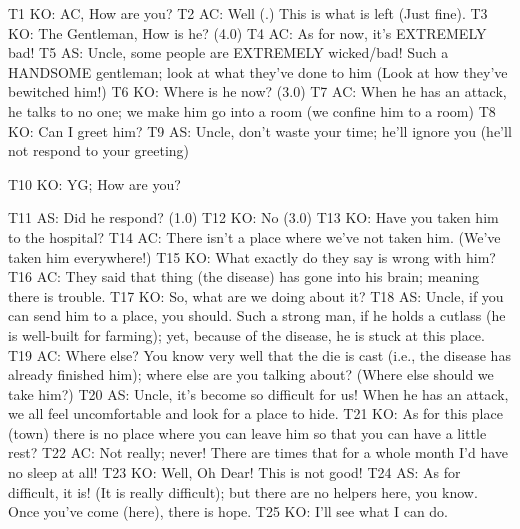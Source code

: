 \documentclass[output=paper,colorlinks,citecolor=brown]{langscibook}
\begin{document}
\begin{exe}
     T1 KO: AC, How are you?
     T2 AC: Well (.) This is what is left (Just fine).
     T3 KO: The Gentleman, How is he? (4.0)
     T4 AC: As for now, it’s EXTREMELY bad!
     T5 AS: Uncle, some people are EXTREMELY wicked/bad! Such a HANDSOME gentleman; look at what they’ve done to him (Look at how they’ve bewitched him!)
     T6 KO: Where is he now? (3.0)
     T7 AC: When he has an attack, he talks to no one; we make him go into a room (we confine him to a room)
     T8 KO: Can I greet him?
     T9 AS: Uncle, don’t waste your time; he’ll ignore you (he’ll not respond to your greeting)
\end{exe}
\begin{exe}
     T10 KO: YG; How are you?
\end{exe}
\begin{exe}
     T11 AS: Did he respond? (1.0)
     T12 KO: No (3.0) 
     T13 KO: Have you taken him to the hospital?
     T14 AC: There isn’t a place where we’ve not taken him. (We’ve taken him everywhere!)
     T15 KO: What exactly do they say is wrong with him?
     T16 AC: They said that thing (the disease) has gone into his brain; meaning there is trouble.
     T17 KO: So, what are we doing about it?
     T18 AS: Uncle, if you can send him to a place, you should. Such a strong man, if he holds a cutlass (he is well-built for farming); yet, because of the disease, he is stuck at this place.
     T19 AC: Where else? You know very well that the die is cast (i.e., the disease has already finished him); where else are you talking about? (Where else should we take him?)
     T20 AS: Uncle, it’s become so difficult for us! When he has an attack, we all feel uncomfortable and look for a place to hide.
     T21 KO: As for this place (town) there is no place where you can leave him so that you can have a little rest?
     T22 AC: Not really; never! There are times that for a whole month I’d have no sleep at all!
     T23 KO: Well, Oh Dear! This is not good!
     T24 AS: As for difficult, it is! (It is really difficult); but there are no helpers here, you know. Once you’ve come (here), there is hope.
     T25 KO: I’ll see what I can do.
\end{exe}
\end{document}
